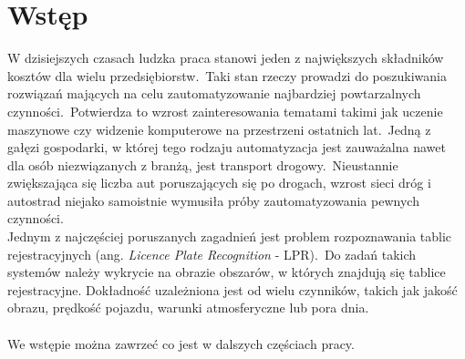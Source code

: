 %


\chapter*{Wstęp}

%
%

W dzisiejszych czasach ludzka praca stanowi jeden z największych składników kosztów dla wielu przedsiębiorstw.\ Taki stan rzeczy prowadzi do poszukiwania rozwiązań mających na celu zautomatyzowanie najbardziej powtarzalnych czynności.\ Potwierdza to wzrost zainteresowania tematami takimi jak uczenie maszynowe czy widzenie komputerowe na przestrzeni ostatnich lat.\ Jedną z gałęzi gospodarki, w której tego rodzaju automatyzacja jest zauważalna nawet dla osób niezwiązanych z branżą, jest transport drogowy.\ Nieustannie zwiększająca się liczba aut poruszających się po drogach, wzrost sieci dróg i autostrad niejako samoistnie wymusiła próby zautomatyzowania pewnych czynności.\\

Jednym z najczęściej poruszanych zagadnień jest problem rozpoznawania tablic rejestracyjnych (ang. \textit{Licence Plate Recognition} - LPR).\ Do zadań takich systemów należy wykrycie na obrazie obszarów, w których znajdują się tablice rejestracyjne.
Dokładność uzależniona jest od wielu czynników, takich jak jakość obrazu, prędkość pojazdu, warunki atmosferyczne lub pora dnia.
\\\\We wstępie można zawrzeć co jest w dalszych częściach pracy.
